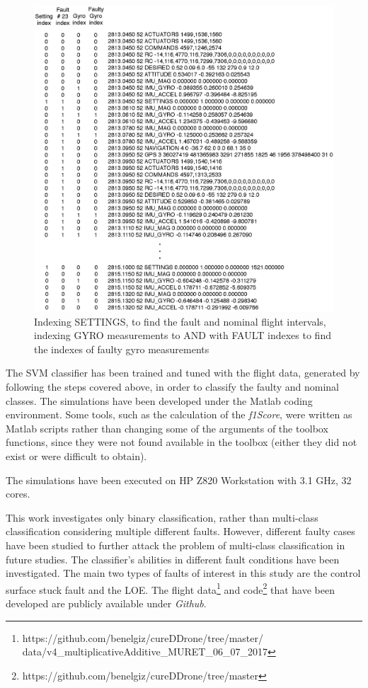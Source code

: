 \begin{figure}[H]
\begin{center}
\includegraphics[width=15.1cm]{figures/labelingGyroAccel}    %
\caption{Indexing SETTINGS, to find the fault and nominal flight intervals, indexing GYRO measurements to AND with FAULT indexes to find the indexes of faulty gyro measurements} 
\label{fig:labelingGyroAccel}
\end{center}
\end{figure}

The SVM classifier has been trained and tuned with the flight data, generated by following the steps covered above, in order to classify the faulty and nominal classes.
The simulations have been developed under the Matlab coding environment. 
Some tools, such as the calculation of the \emph{f1Score}, were written as Matlab scripts rather than changing some of the arguments of the toolbox functions, since they were not found available in the toolbox (either they did not exist or were difficult to obtain).
 
The simulations have been executed on HP Z820 Workstation with 3.1 GHz, 32 cores. 
 
This work investigates only binary classification, rather than multi-class classification considering multiple different faults.  
However, different faulty cases have been studied to further attack the problem of multi-class classification in future studies. 
The classifier's abilities in different fault conditions have been investigated. 
The main two types of faults of interest in this study are the control surface stuck fault and the LOE. 
The flight data\footnote{https://github.com/benelgiz/cureDDrone/tree/master/ \\ data/v4\_multiplicativeAdditive\_MURET\_06\_07\_2017} and code\footnote{https://github.com/benelgiz/cureDDrone/tree/master} that have been developed are publicly available under \emph{Github}.


